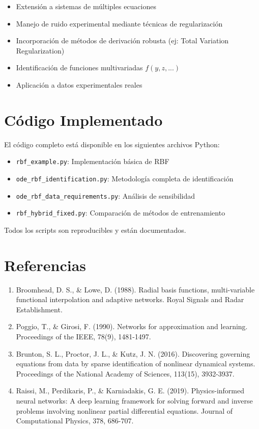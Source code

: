 \documentclass[11pt,a4paper]{article}
\begin{document}
\begin{itemize}
    \item Extensión a sistemas de múltiples ecuaciones
    \item Manejo de ruido experimental mediante técnicas de regularización
    \item Incorporación de métodos de derivación robusta (ej: Total Variation Regularization)
    \item Identificación de funciones multivariadas $f(y, z, ...)$
    \item Aplicación a datos experimentales reales
\end{itemize}

\section{Código Implementado}

El código completo está disponible en los siguientes archivos Python:

\begin{itemize}
    \item \texttt{rbf\_example.py}: Implementación básica de RBF
    \item \texttt{ode\_rbf\_identification.py}: Metodología completa de identificación
    \item \texttt{ode\_rbf\_data\_requirements.py}: Análisis de sensibilidad
    \item \texttt{rbf\_hybrid\_fixed.py}: Comparación de métodos de entrenamiento
\end{itemize}

Todos los scripts son reproducibles y están documentados.

\section*{Referencias}

\begin{enumerate}
    \item Broomhead, D. S., \& Lowe, D. (1988). Radial basis functions, multi-variable functional interpolation and adaptive networks. Royal Signals and Radar Establishment.

    \item Poggio, T., \& Girosi, F. (1990). Networks for approximation and learning. Proceedings of the IEEE, 78(9), 1481-1497.

    \item Brunton, S. L., Proctor, J. L., \& Kutz, J. N. (2016). Discovering governing equations from data by sparse identification of nonlinear dynamical systems. Proceedings of the National Academy of Sciences, 113(15), 3932-3937.

    \item Raissi, M., Perdikaris, P., \& Karniadakis, G. E. (2019). Physics-informed neural networks: A deep learning framework for solving forward and inverse problems involving nonlinear partial differential equations. Journal of Computational Physics, 378, 686-707.
\end{enumerate}
\end{document}
